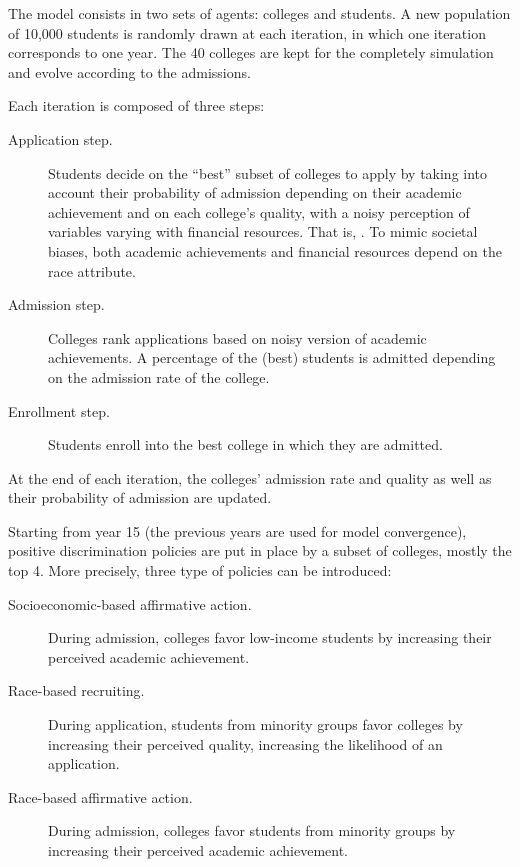 The model consists in two sets of agents: colleges and students. 
A new population of 10,000 students is randomly drawn at each iteration, in which one iteration corresponds to one year. 
The 40 colleges are kept for the completely simulation and evolve according to the admissions.

Each iteration is composed of three steps:

\begin{description}

\item[Application step.] Students decide on the ``best'' subset of colleges to apply by taking into account their probability of admission depending on their academic achievement and on each college's quality, with a noisy perception of variables varying with financial resources. That is, .
To mimic societal biases, both academic achievements and financial resources depend on the race attribute.

\item[Admission step.] Colleges rank applications based on noisy version of academic achievements. 
A percentage of the (best) students is admitted depending on the admission rate of the college.

\item[Enrollment step.] Students enroll into the best college in which they are admitted.

\end{description}

At the end of each iteration, the colleges' admission rate and quality as well as their probability of admission are updated.

Starting from year 15 (the previous years are used for model
convergence), positive discrimination policies are put in place by a subset of colleges, mostly the top 4.
More precisely, three type of policies can be introduced:

\begin{description}

\item[Socioeconomic-based affirmative action.] During admission, colleges favor low-income students by increasing their perceived academic achievement.

\item[Race-based recruiting.] During application, students from minority groups favor colleges by increasing their perceived quality, increasing the likelihood of an application.

\item[Race-based affirmative action.] During admission, colleges favor students from minority groups by increasing their perceived academic achievement.

\end{description}

